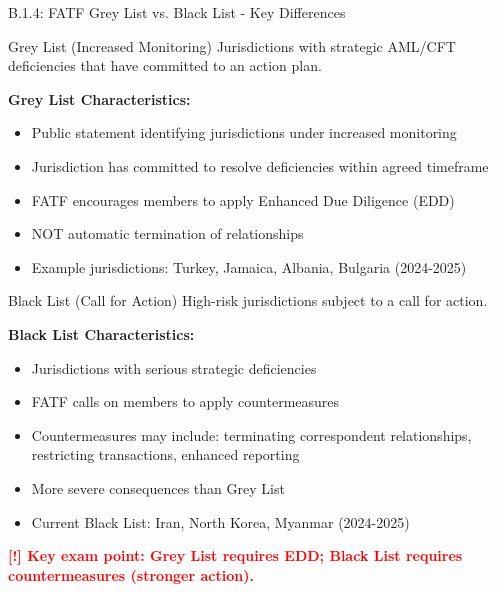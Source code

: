 \documentclass[11pt,a4paper]{beamer}
\newcommand{\redflag}[1]{\textcolor{red}{\textbf{[!] #1}}}
\begin{document}
	\begin{frame}{B.1.4: FATF Grey List vs. Black List - Key Differences}
		\begin{block}{Grey List (Increased Monitoring)}
			Jurisdictions with strategic AML/CFT deficiencies that have committed to an action plan.
		\end{block}
		\textbf{Grey List Characteristics:}
		\begin{itemize}
			\item Public statement identifying jurisdictions under increased monitoring
			\item Jurisdiction has committed to resolve deficiencies within agreed timeframe
			\item FATF encourages members to apply Enhanced Due Diligence (EDD)
			\item NOT automatic termination of relationships
			\item Example jurisdictions: Turkey, Jamaica, Albania, Bulgaria (2024-2025)
		\end{itemize}
		\begin{block}{Black List (Call for Action)}
			High-risk jurisdictions subject to a call for action.
		\end{block}
		\textbf{Black List Characteristics:}
		\begin{itemize}
			\item Jurisdictions with serious strategic deficiencies
			\item FATF calls on members to apply countermeasures
			\item Countermeasures may include: terminating correspondent relationships, restricting transactions, enhanced reporting
			\item More severe consequences than Grey List
			\item Current Black List: Iran, North Korea, Myanmar (2024-2025)
		\end{itemize}
		\redflag{Key exam point: Grey List requires EDD; Black List requires countermeasures (stronger action).}
	\end{frame}
	
\end{document}
